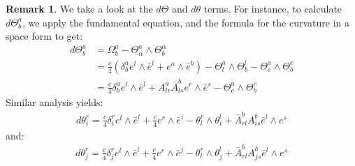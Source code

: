 \documentclass[11pt]{amsart}
\theoremstyle{definition}
\newtheorem{remark}[subsection]{Remark}
\begin{document}
\begin{remark}  We take a look at the $d \Theta$ and $d \theta$ terms.  For instance, to calculate $d \Theta^a_b$, we apply the fundamental equation, and the formula for the curvature in a space form to get:
%
\begin{align*}
d \Theta^a_b &= \Omega^a_b - \Theta^a_{\alpha} \wedge \Theta^{\alpha}_b \\
&= \frac{c}{4}( \delta^a_b e^l \wedge \bar{e}^l + e^a \wedge \bar{e}^b ) - \Theta^a_l \wedge \Theta^l_b - \Theta^a_c \wedge \Theta^c_b \\
&= \frac{c}{4} \delta^a_b e^l \wedge \bar{e}^l + A^a_{lr} \bar{A}^b_{ls} e^r \wedge \bar{e}^s - \Theta^a_c \wedge \Theta^c_b
\end{align*}
%
Similar analysis yields:
%
\begin{align*}
d \theta^r_i = \frac{c}{4} \delta^r_i e^l \wedge \bar{e}^l + \frac{c}{4} e^r \wedge \bar{e}^i - \theta^r_l \wedge \theta^l_i + \bar{A}^b_{rl} A^b_{is} \bar{e}^l \wedge e^s
\end{align*}
%
and:
%
\begin{align*}
d \theta^r_j = \frac{c}{4} \delta^r_j e^l \wedge \bar{e}^l + \frac{c}{4} e^r \wedge \bar{e}^j - \theta^r_l \wedge \theta^l_j + \bar{A}^b_{rl} A^b_{js} \bar{e}^l \wedge e^s
\end{align*}
%
\end{remark}

\bigskip
\end{document}
